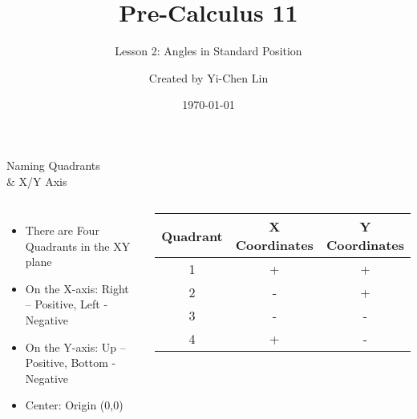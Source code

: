 \documentclass[aspectratio=169]{beamer}
\title{Pre-Calculus 11}
\subtitle{Lesson 2: Angles in Standard Position}
\author{Created by Yi-Chen Lin}
\date{\today}
\begin{document}
\begin{frame}
    \titlepage
    \vfill
    \centering
\end{frame}

\begin{frame}{Naming Quadrants \\& X/Y Axis}
    \begin{tcolorbox}[colback=lightgray,colframe=primary,title=Quadrants and Axes]
        \footnotesize
        \begin{columns}
            \begin{itemize}
                \item There are Four Quadrants in the XY plane
                \item On the X-axis: Right – Positive, Left - Negative
                \item On the Y-axis: Up – Positive, Bottom - Negative
                \item Center: Origin (0,0)
            \end{itemize}
            \begin{center}
            \begin{tabular}{|c|c|c|}
            \hline
            Quadrant & X Coordinates & Y Coordinates \\
            \hline
            1 & + & + \\
            2 & - & + \\
            3 & - & - \\
            4 & + & - \\
            \hline
            \end{tabular}
            \end{center}
        \end{columns}
    \end{tcolorbox}
\end{frame}
\end{document}
